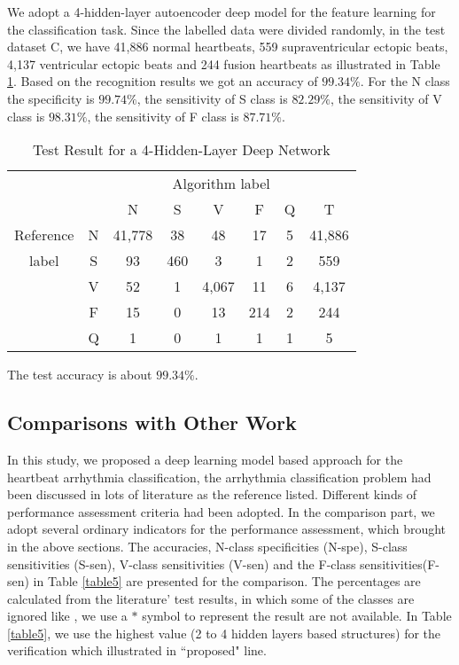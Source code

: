 \documentclass{bmcart}
\begin{document}
We adopt a 4-hidden-layer autoencoder deep model for the feature learning for the classification task. Since the labelled data were divided randomly, in the test dataset C, we have 41,886 normal heartbeats, 559 supraventricular ectopic beats, 4,137 ventricular ectopic beats and 244 fusion heartbeats as illustrated in Table \ref{table4}. Based on the recognition results we got an accuracy of $99.34\%$. For the N class the specificity is $99.74\%$, the sensitivity of S class is $82.29\%$, the sensitivity of V class is $98.31\%$, the sensitivity of F class is $87.71\%$.



\begin{table}[!htbp]
\begin{center}
\begin{threeparttable}
\caption{Test Result for a 4-Hidden-Layer Deep Network}
\label{table4}
\begin{tabular}{cccccccc}
\hline
\multicolumn{6}{r}{Algorithm label} \\
\cline{3-7}
		&  & N & S      & V    & F     & Q   & T\\
\hline
 Reference & N & 41,778 &  38  &  48   & 17  & 5  &  41,886 \\
	label  & S &  93    & 460  &   3   & 1   & 2  &  559\\
		   & V &  52    & 1    & 4,067 & 11  & 6  &  4,137\\
		   & F &  15    & 0    & 13    & 214 & 2  &  244\\
		   & Q &  1     & 0    & 1     & 1   & 1  &  5\\
\hline
\end{tabular}
\begin{tablenotes}
\item The test accuracy is about $99.34\%$.
\end{tablenotes}
\end{threeparttable}
\end{center}
\end{table}



\subsection*{Comparisons with Other Work}
In this study, we proposed a deep learning model based approach for the heartbeat arrhythmia classification, the arrhythmia classification problem had been discussed in lots of literature as the reference listed. Different kinds of performance assessment criteria had been adopted. In the comparison part, we adopt several ordinary indicators for the performance assessment, which brought in the above sections. The accuracies, N-class specificities (N-spe), S-class sensitivities (S-sen), V-class sensitivities (V-sen) and the F-class sensitivities(F-sen) in Table \ref{table5} are presented for the comparison. The percentages are calculated from the literature' test results, in which some of the classes are ignored like \cite{melgan}, we use a $*$ symbol to represent the result are not available. 
In Table \ref{table5}, we use the highest value (2 to 4 hidden layers based structures) for the verification which illustrated in ``proposed" line.
\end{document}
